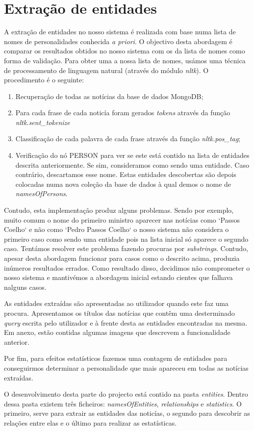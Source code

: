 \section{Extração de entidades}
A extração de entidades no nosso sistema é realizada com base numa lista de nomes de personalidades conhecida \textit{a priori}. O objectivo desta abordagem é comparar os resultados obtidos no nosso sistema com os da lista de nomes como forma de validação. Para obter uma a nossa lista de nomes, usámos uma técnica de processamento de linguagem natural (através do módulo \textit{nltk}). O procedimento é o seguinte:


\begin{enumerate}
  \item Recuperação de todas as notícias da base de dados MongoDB;
  \item Para cada frase de cada noticía foram gerados \textit{tokens} através da função \textit{nltk.sent\_tokenize}
  \item Classificação de cada palavra de cada frase através da função \textit{nltk.pos\_tag};
  \item Verificação do nó PERSON para ver se este está contido na lista de entidades descrita anteriormente. Se sim, consideramos como sendo uma entidade. Caso contrário, descartamos esse nome. Estas entidades descobertas são depois colocadas numa nova coleção da base de dados à qual demos o nome de \textit{namesOfPersons}. 
\end{enumerate}

Contudo, esta implementação produz alguns problemas. Sendo por exemplo, muito comum o nome do primeiro ministro aparecer nas notícias como `Passos Coelho` e não como `Pedro Passos Coelho` o nosso sistema não considera o primeiro caso como sendo uma entidade pois na lista inicial só aparece o segundo caso. Tentámos resolver este problema fazendo procuras por \textit{substrings}. Contudo, apesar desta abordagem funcionar para casos como o descrito acima, produzia inúmeros resultados errados. Como resultado disso, decidimos não comprometer o nosso sistema e mantivémos a abordagem inicial estando cientes que falhava nalguns casos.

As entidades extraídas são apresentadas ao utilizador quando este faz uma procura. Apresentamos os títulos das notícias que contêm uma desterminado \textit{query} escrita pelo utilizador e à frente desta as entidades encontradas na mesma. Em anexo, estão contidas algumas imagens que descrevem a funcionalidade anterior.

Por fim, para efeitos estatísticos fazemos uma contagem de entidades para conseguirmos determinar a personalidade que mais apareceu em todas as notícias extraídas.

O desenvolvimento desta parte do projecto está contido na pasta \textit{entities}. Dentro dessa pasta existem três ficheiros: \textit{namesOfEntities}, \textit{relationships} e \textit{statistics}. O primeiro, serve para extrair as entidades das noticías, o segundo para descobrir as relações entre elas e o último para realizar as estatísticas.



